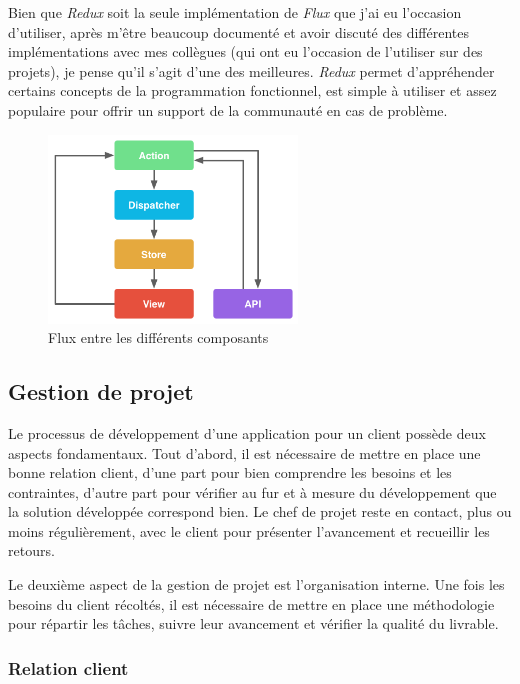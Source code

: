 \bigskip

Bien que \emph{Redux} soit la seule implémentation de \emph{Flux} que
j'ai eu l'occasion d'utiliser, après m'être beaucoup documenté et avoir
discuté des différentes implémentations avec mes collègues (qui ont eu
l'occasion de l'utiliser sur des projets), je pense qu'il s'agit d'une
des meilleures. \emph{Redux} permet d'appréhender certains concepts de
la programmation fonctionnel, est simple à utiliser et assez populaire
pour offrir un support de la communauté en cas de problème.

\bigskip

\begin{figure}[h]
  \centering
  \includegraphics[height=5cm]{figures/react.png}
  \caption{Flux entre les différents composants}
\end{figure}

\subsection{Gestion de projet}\label{gestion-de-projet}

Le processus de développement d'une application pour un client possède
deux aspects fondamentaux. Tout d'abord, il est nécessaire de mettre en
place une bonne relation client, d'une part pour bien comprendre les
besoins et les contraintes, d'autre part pour vérifier au fur et à
mesure du développement que la solution développée correspond bien. Le
chef de projet reste en contact, plus ou moins régulièrement, avec le
client pour présenter l'avancement et recueillir les retours.

\bigskip

Le deuxième aspect de la gestion de projet est l'organisation interne.
Une fois les besoins du client récoltés, il est nécessaire de mettre en
place une méthodologie pour répartir les tâches, suivre leur avancement
et vérifier la qualité du livrable.

\bigskip

\subsubsection{Relation client}\label{relation-client}

